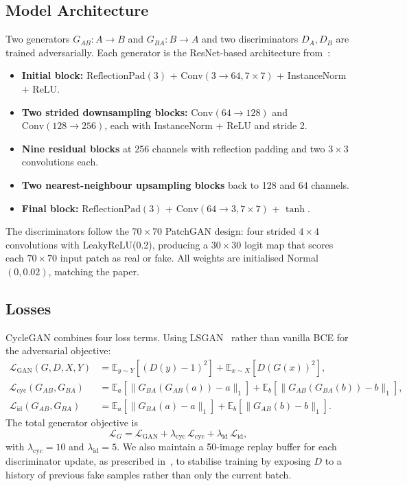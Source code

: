 \documentclass[runningheads]{llncs}
\begin{document}
\subsection{Model Architecture}

Two generators $G_{AB}: A \to B$ and $G_{BA}: B \to A$ and two
discriminators $D_A, D_B$ are trained adversarially. Each generator is
the ResNet-based architecture from~\cite{cyclegan}:

\begin{itemize}
\item \textbf{Initial block:} $\mathrm{ReflectionPad}(3)$ +
$\mathrm{Conv}(3\!\to\!64, 7\times 7)$ + InstanceNorm + ReLU.
\item \textbf{Two strided downsampling blocks:} $\mathrm{Conv}(64\!\to\!128)$
and $\mathrm{Conv}(128\!\to\!256)$, each with InstanceNorm + ReLU and
stride 2.
\item \textbf{Nine residual blocks} at 256 channels with reflection
padding and two $3\times 3$ convolutions each.
\item \textbf{Two nearest-neighbour upsampling blocks} back to 128 and
64 channels.
\item \textbf{Final block:} $\mathrm{ReflectionPad}(3)$ +
$\mathrm{Conv}(64\!\to\!3, 7\times 7)$ + $\tanh$.
\end{itemize}

The discriminators follow the $70\times 70$ PatchGAN design: four
strided $4\times 4$ convolutions with LeakyReLU(0.2), producing a
$30\times 30$ logit map that scores each $70\times 70$ input patch as
real or fake. All weights are initialised Normal$(0, 0.02)$, matching
the paper.

\subsection{Losses}

CycleGAN combines four loss terms. Using LSGAN~\cite{lsgan} rather than
vanilla BCE for the adversarial objective:
\begin{align}
\mathcal{L}_{\mathrm{GAN}}(G, D, X, Y) &=
\mathbb{E}_{y\sim Y}\!\left[(D(y)-1)^2\right]
+ \mathbb{E}_{x\sim X}\!\left[D(G(x))^2\right], \\
\mathcal{L}_{\mathrm{cyc}}(G_{AB}, G_{BA}) &=
\mathbb{E}_a\!\left[\lVert G_{BA}(G_{AB}(a)) - a \rVert_1\right]
+ \mathbb{E}_b\!\left[\lVert G_{AB}(G_{BA}(b)) - b \rVert_1\right], \\
\mathcal{L}_{\mathrm{id}}(G_{AB}, G_{BA}) &=
\mathbb{E}_a\!\left[\lVert G_{BA}(a) - a \rVert_1\right]
+ \mathbb{E}_b\!\left[\lVert G_{AB}(b) - b \rVert_1\right].
\end{align}
The total generator objective is
\begin{equation}
\mathcal{L}_G = \mathcal{L}_{\mathrm{GAN}} +
\lambda_{\mathrm{cyc}}\,\mathcal{L}_{\mathrm{cyc}} +
\lambda_{\mathrm{id}}\,\mathcal{L}_{\mathrm{id}},
\end{equation}
with $\lambda_{\mathrm{cyc}}=10$ and $\lambda_{\mathrm{id}}=5$. We also
maintain a 50-image replay buffer for each discriminator update, as
prescribed in~\cite{cyclegan}, to stabilise training by exposing $D$
to a history of previous fake samples rather than only the current
batch.
\end{document}
